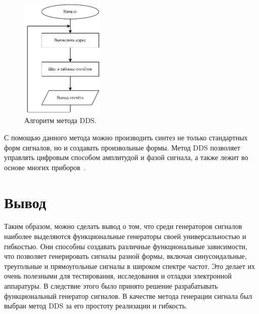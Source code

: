 	\begin{figure}[H]
    \centering
    \includegraphics[width=0.35\textwidth]{../image/dds_block.pdf}
    \caption{Алгоритм метода DDS.}
	\end{figure}
	
	С помощью данного метода можно производить синтез не только стандартных форм сигналов, но и создавать произвольные формы. Метод DDS позволяет управлять цифровым способом амплитудой и фазой сигнала, а также лежит во основе многих приборов~\cite{dds_en}.
	
\section{Вывод}
	Таким образом, можно сделать вывод о том, что среди генераторов сигналов наиболее  выделяются функциональные генераторы своей универсальностью и гибкостью. Они способны создавать различные функциональные зависимости, что позволяет генерировать сигналы разной формы, включая синусоидальные, треугольные и прямоугольные сигналы в широком спектре частот. Это делает их очень полезными для тестирования, исследования и отладки электронной аппаратуры. В следствие этого было принято решение разрабатывать функциональный генератор сигналов. В качестве метода генерации сигнала был выбран метод DDS за его простоту реализации и гибкость.
	
	
